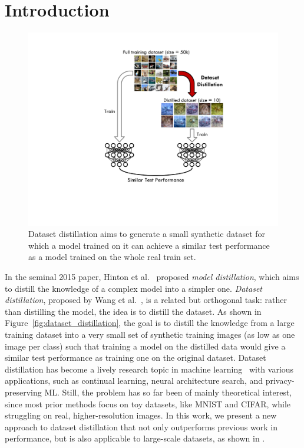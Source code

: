 \section{Introduction}






\begin{figure}
    \centering
    \vspace{-0.5cm}%
    \includegraphics[scale=0.58, trim=230 106 150 20, clip]{figures/figure_2_dataset_distillation.pdf}\vspace{-0.85cm}
    \caption{Dataset distillation aims to generate a small synthetic dataset for which a model trained on it can achieve a similar test performance as a model trained on the whole real train set.}%
    \vspace{-5pt}
\end{figure}

In the seminal 2015 paper, Hinton et al.~\cite{hinton2015distilling} proposed {\em model distillation}, which aims to distill the knowledge of a complex model into a simpler one.  
{\em Dataset distillation}, proposed by Wang et al.~\cite{dd}, is a related but orthogonal task: rather
than distilling the model, the idea is to distill the dataset. 
As shown in Figure~\ref{fig:dataset_distillation}, the goal is to distill the knowledge from a large training dataset into a very small set of synthetic training images (as low as one image per class) such that training a model on the distilled data would give a similar test performance as training one on the original dataset. Dataset distillation has become a lively research topic in machine learning~\cite{bohdal2020flexible,sucholutsky2021soft,dc,dsa,nguyen2020dataset,nguyen2021dataset,dm} with various applications, such as continual learning, neural architecture search, and privacy-preserving ML. Still, the problem has so far been of mainly theoretical interest, since most prior methods focus on toy datasets, like MNIST and \mbox{CIFAR}, while struggling on real, higher-resolution images. In this work, we present a new approach to dataset distillation that not only outperforms previous work in performance, but is also applicable to large-scale datasets, as shown in .


